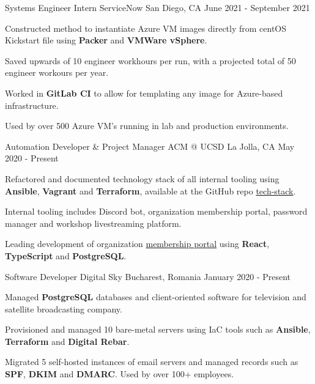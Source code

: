 \begin{cventries}
  \cventry
    {Systems Engineer Intern}
    {ServiceNow}
    {San Diego, CA}
    {June 2021 - September 2021}
    {
      \begin{cvitems}
        \item {Constructed method to instantiate Azure VM images directly from centOS Kickstart file using \textbf{Packer} and \textbf{VMWare vSphere}.}
        \item {Saved upwards of 10 engineer workhours per run, with a projected total of 50 engineer workours per year.}
        \item {Worked in \textbf{GitLab CI} to allow for templating any image for Azure-based infrastructure.}
        \item {Used by over 500 Azure VM's running in lab and production environments.}
      \end{cvitems}
    }
  \cventry
  {Automation Developer \& Project Manager}
  {ACM @ UCSD}
  {La Jolla, CA}
  {May 2020 - Present}
  {
    \begin{cvitems}
      \item {Refactored and documented technology stack of all internal tooling using \textbf{Ansible}, \textbf{Vagrant} and \textbf{Terraform}, available at the GitHub repo \href{https://github.com/acmucsd/tech-stack}{tech-stack}.}
      \item {Internal tooling includes Discord bot, organization membership portal, password manager and workshop livestreaming platform.}
      \item {Leading development of organization \href{https://github.com/acmucsd/membership-portal-ui}{membership portal} using \textbf{React}, \textbf{TypeScript} and \textbf{PostgreSQL}.}
    \end{cvitems}
  }
  \cventry
    {Software Developer}
    {Digital Sky}
    {Bucharest, Romania}
    {January 2020 - Present}
    {
      \begin{cvitems}
        \item {Managed \textbf{PostgreSQL} databases and client-oriented software for television and satellite broadcasting company.}
        \item {Provisioned and managed 10 bare-metal servers using IaC tools such as \textbf{Ansible}, \textbf{Terraform} and \textbf{Digital Rebar}.}
        \item {Migrated 5 self-hosted instances of email servers and managed records such as \textbf{SPF}, \textbf{DKIM} and \textbf{DMARC}. Used by over 100+ employees.}

\end{cvitems}}
\end{cventries}
